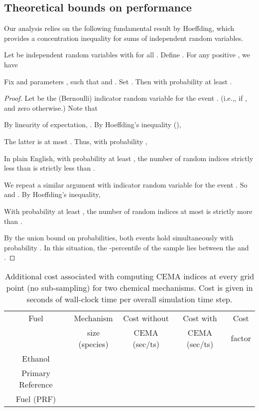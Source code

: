 \documentclass[final]{siamltex}
\begin{document}
\subsection{Theoretical bounds on performance}
Our analysis  relies on the  following fundamental result by Hoeffding, which provides a concentration inequality for sums of independent random variables.

\begin{theorem}
  \label{thm:Hoeffding}
  Let  be independent random variables with  for all .  Define . 
  For any positive , we have 
\end{theorem}

\begin{lemma} \label{lem:perc} Fix  and parameters , such that  and .
Set . Then 
with probability at least .
\end{lemma}

\vspace{2ex}
\begin{proof} Let  be the (Bernoulli) indicator random variable for the event . (i.e.,, if ,
and zero otherwise.) Note that 

By linearity of expectation, . By Hoeffding's inequality (),

The latter is at most . Thus, with probability ,

In plain English, with probability at least , the number of random indices
strictly less than  is strictly less than .

We repeat a similar argument with indicator random variable  for the event . So 
and . By Hoeffding's inequality,

With probability at least , the number of random indices at most 
is strictly more than .

By the union bound on probabilities, both events hold simultaneously with probability .
In this situation, the -percentile of the sample lies between the 
and .
\end{proof}
\begin{table}[t]
\caption{ Additional cost associated with computing CEMA indices at every grid point (no sub-sampling) for two chemical mechanisms. Cost is given in seconds of wall-clock time per overall simulation time step. \label{tab:cema_costs}}
\begin{center}
 \begin{tabular}{| c | c | c | c | c |}
 \hline \hline
Fuel         & Mechanism       &  Cost without    & Cost with       &  Cost     \\
             & size (species)  &    CEMA (sec/ts) & CEMA (sec/ts)   & factor    \\ \hline \hline 
 Ethanol     &               &           &              &       \\
\hline
Primary Reference & & & & \\
Fuel (PRF) &           &           &            &      \\\hline \hline 
\end{tabular}
\end{center}
\end{table}  
\end{document}
